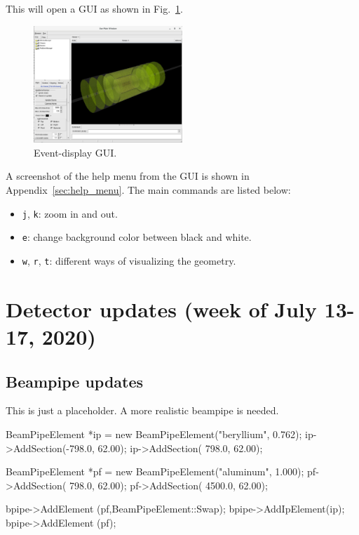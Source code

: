 \documentclass[12pt]{article}
\begin{document}
This will open a GUI as shown in Fig.~\ref{fig:visual}.

\begin{figure}[H]
\centering
\includegraphics[width=0.5\textwidth]{figures/viewer.png}
\caption{Event-display GUI.}
\label{fig:visual}
\end{figure}

A screenshot of the help menu from the GUI is shown in Appendix~\ref{sec:help_menu}.
The main commands are listed below:

\begin{itemize}
\item \verb|j|, \verb|k|: zoom in and out.
\item \verb|e|: change background color between black and white.
\item \verb|w|, \verb|r|, \verb|t|: different ways of visualizing the geometry.
\end{itemize}

\section{Detector updates (week of July 13-17, 2020)}

\subsection{Beampipe updates}

This is just a placeholder. A more realistic beampipe is needed.

\begin{tcolorbox}
\begin{verbnobox}[\scriptsize]
BeamPipeElement *ip = new BeamPipeElement("beryllium", 0.762);
ip->AddSection(-798.0, 62.00);
ip->AddSection( 798.0, 62.00);

BeamPipeElement *pf = new BeamPipeElement("aluminum", 1.000);
pf->AddSection(  798.0, 62.00);
pf->AddSection( 4500.0, 62.00);

bpipe->AddElement  (pf,BeamPipeElement::Swap);
bpipe->AddIpElement(ip);
bpipe->AddElement  (pf);
\end{verbnobox}  
\end{tcolorbox}
\end{document}
